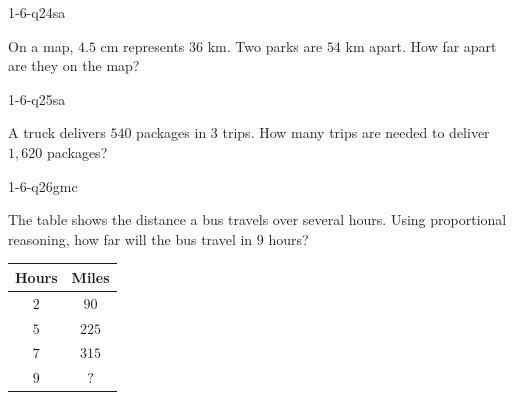 \begin{practiceQuestion}{1-6-q24}{sa}
\begin{questionText}
On a map, $4.5$ cm represents $36$ km. Two parks are $54$ km apart. How far apart are they on the map?
\end{questionText}
\end{practiceQuestion}

\begin{practiceQuestion}{1-6-q25}{sa}
\begin{questionText}
A truck delivers $540$ packages in $3$ trips. How many trips are needed to deliver $1{,}620$ packages?
\end{questionText}
\end{practiceQuestion}


\begin{practiceQuestion}{1-6-q26}{gmc}
\begin{questionText}
The table shows the distance a bus travels over several hours. Using proportional reasoning, how far will the bus travel in $9$ hours?

\begin{center}
\begin{tabular}{|c|c|}
\hline
\textbf{Hours} & \textbf{Miles} \\ \hline
$2$ & $90$ \\ \hline
$5$ & $225$ \\ \hline
$7$ & $315$ \\ \hline
$9$ & $?$ \\ \hline
\end{tabular}
\end{center}
\end{questionText}
\end{practiceQuestion}

